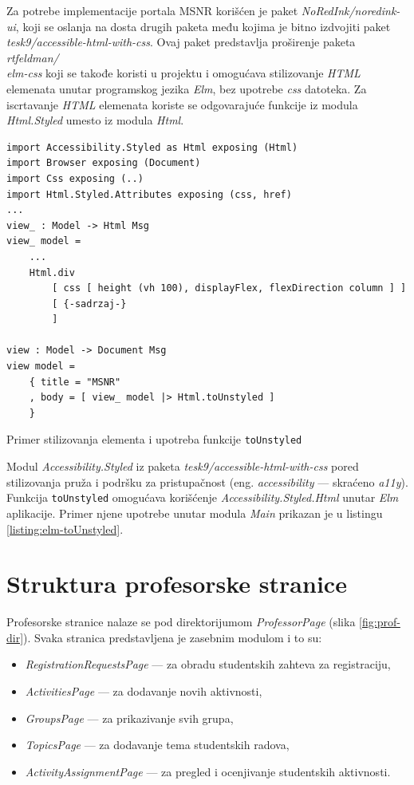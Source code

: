 \documentclass[12pt,oneside]{memoir}
\begin{document}
Za potrebe implementacije portala MSNR korišćen je paket \emph{NoRedInk/noredink-ui},
koji se oslanja na dosta drugih paketa među kojima je bitno izdvojiti paket 
\emph{tesk9/accessible-html-with-css}.
Ovaj paket predstavlja proširenje paketa \emph{rtfeldman/\\elm-css} koji se takođe koristi u projektu
i omogućava stilizovanje \emph{HTML} elemenata unutar programskog jezika \emph{Elm}, bez upotrebe
\emph{css} datoteka. Za iscrtavanje \emph{HTML} elemenata koriste se odgovarajuće funkcije iz
modula \emph{Html.Styled} umesto iz modula \emph{Html}.

\begin{listing}[h]
\begin{verbatim}
import Accessibility.Styled as Html exposing (Html)
import Browser exposing (Document)
import Css exposing (..)
import Html.Styled.Attributes exposing (css, href)
...
view_ : Model -> Html Msg
view_ model =
    ... 
    Html.div
        [ css [ height (vh 100), displayFlex, flexDirection column ] ]
        [ {-sadrzaj-}
        ]

view : Model -> Document Msg
view model =
    { title = "MSNR"
    , body = [ view_ model |> Html.toUnstyled ]
    }
\end{verbatim}
\caption{Primer stilizovanja elementa i upotreba funkcije \texttt{toUnstyled}}
\label{listing:elm-toUnstyled}
\end{listing}

Modul \emph{Accessibility.Styled} iz paketa \emph{tesk9/accessible-html-with-css} pored stilizovanja pruža i podršku za pristupačnost \cite{a11y}
(eng. \emph{accessibility} --- skraćeno \emph{a11y}). Funkcija \texttt{toUnstyled} omogućava korišćenje \emph{Accessibility.Styled.Html} unutar \emph{Elm} aplikacije.
Primer njene upotrebe unutar modula \emph{Main} prikazan je u listingu \ref{listing:elm-toUnstyled}.

\section{Struktura profesorske stranice}
Profesorske stranice nalaze se pod direktorijumom \emph{ProfessorPage} (slika \ref{fig:prof-dir}).
Svaka stranica predstavljena je zasebnim modulom i to su:
\begin{itemize}
  \item \emph{RegistrationRequestsPage} --- za obradu studentskih zahteva za registraciju,
  \item \emph{ActivitiesPage} --- za dodavanje novih aktivnosti,
  \item \emph{GroupsPage} --- za prikazivanje svih grupa,
  \item \emph{TopicsPage} --- za dodavanje tema studentskih radova,
  \item \emph{ActivityAssignmentPage} --- za pregled i ocenjivanje studentskih aktivnosti.
\end{itemize}
\end{document}
